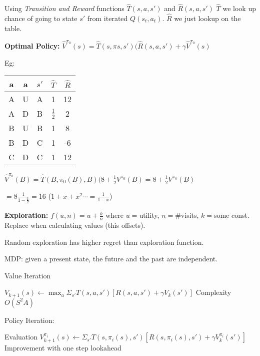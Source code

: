 \documentclass[10pt,letter]{article}
\begin{document}
\begin{multicols}{2}
Using \textit{Transition and Reward} functions $\hat{T}(s,a,s')$ and $\hat{R}(s,a,s')$
$\hat{T}$ we look up chance of going to state $s'$ from iterated $Q(s_t,a_t)$. 
$\hat{R}$ we just lookup on the table.

\textbf{Optimal Policy:}
$\hat{V}^{\pi_0}(s) = \hat{T}(s,\pi{s},s')(\hat{R}(s,a,s') + \gamma\hat{V}^{\pi_0}(s)$

Eg:

\begin{tabular}{|c|c|c|c|c|}
    \hline
    a & a & $s'$ & $\hat{T}$ & $\hat{R}$\\\hline
    A & U & A & 1 & 12\\\hline
    A & D & B & $\frac12$ & 2 \\\hline
    B & U & B & 1 & 8\\\hline
    B & D & C & 1 & -6\\\hline
    C & D & C & 1 & 12\\\hline
\end{tabular}

$\hat{V}^{\pi_0}(B) = \hat{T}(B,\pi_0(B),B)(8 + \frac12 V^{\pi_0}(B)=8 + \frac12 V^{\pi_0}(B)$ 

$= 8 \frac{1}{1-\frac12}=16$ ($1+x+x^2\cdots = \frac{1}{1-x}$)

\textbf{Exploration:} $f(u,n)=u + \frac{k}{n}$ where $u=$utility, $n=$\#visits,
$k=$some const. Replace when calculating values (this offsets).

Random exploration has higher regret than exploration function.

MDP: given a present state, the future and the past are independent.

Value Iteration 

$V_{k+1}(s) \gets \max_a\Sigma_{s'}T(s,a,s')[R(s,a,s') + \gamma V_k(s')]$
Complexity $O(S^2A)$

Policy Iteration:

Evaluation $V_{k+1}^{\pi_i}(s)\gets\Sigma_{s'}T(s,\pi_i(s),s')[R(s,\pi_i(s),s')+\gamma V_k^{\pi_i}(s')]$
Improvement with one step lookahead





\end{multicols}
\end{document}
